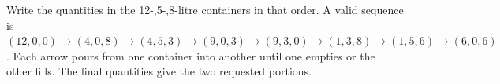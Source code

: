 Write the quantities in the 12-,5-,8-litre containers in that order. A valid sequence is $(12,0,0)\to(4,0,8)\to(4,5,3)\to(9,0,3)\to(9,3,0)\to(1,3,8)\to(1,5,6)\to(6,0,6)$. Each arrow pours from one container into another until one empties or the other fills. The final quantities give the two requested portions.
